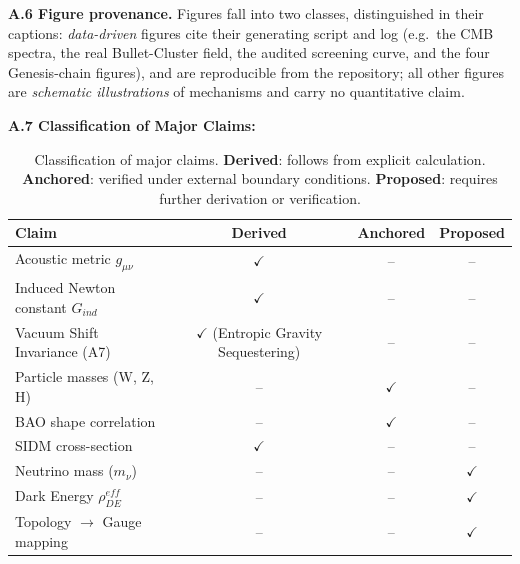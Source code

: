 \documentclass[a4paper,12pt]{article}
\begin{document}
\textbf{A.6 Figure provenance.} Figures fall into two classes, distinguished in
their captions: \emph{data-driven} figures cite their generating script and log
(e.g.\ the CMB spectra, the real Bullet-Cluster field, the audited screening
curve, and the four Genesis-chain figures), and are reproducible from the
repository; all other figures are \emph{schematic illustrations} of mechanisms
and carry no quantitative claim.

\textbf{A.7 Classification of Major Claims:}
\begin{table}[H]
\centering
\small
\begin{tabular}{lccc}
\toprule
\textbf{Claim} & \textbf{Derived} & \textbf{Anchored} & \textbf{Proposed} \\
\midrule
Acoustic metric $g_{\mu\nu}$ & $\checkmark$ & -- & -- \\
Induced Newton constant $G_{ind}$ & $\checkmark$ & -- & -- \\
Vacuum Shift Invariance (A7) & $\checkmark$ (Entropic Gravity Sequestering) & -- & -- \\
Particle masses (W, Z, H) & -- & $\checkmark$ & -- \\
BAO shape correlation & -- & $\checkmark$ & -- \\
SIDM cross-section & $\checkmark$ & -- & -- \\
Neutrino mass ($m_\nu$) & -- & -- & $\checkmark$ \\
Dark Energy $\rho_{DE}^{eff}$ & -- & -- & $\checkmark$ \\
Topology $\to$ Gauge mapping & -- & -- & $\checkmark$ \\
\bottomrule
\end{tabular}
\caption{Classification of major claims. \textbf{Derived}: follows from explicit calculation. \textbf{Anchored}: verified under external boundary conditions. \textbf{Proposed}: requires further derivation or verification.}
\end{table}

\end{document}
